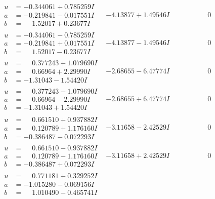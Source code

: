 \documentclass[1p]{elsarticle_modified}
\theoremstyle{definition}
\begin{document}
$$\begin{array}{c|c|c}
 \hline 
\begin{aligned}
u &= -0.344061 + 0.785259 I \\
a &= -0.219841 - 0.017551 I \\
b &= \phantom{-}1.52017 + 0.23677 I\end{aligned}
 & -4.13877 + 1.49546 I & \phantom{-0.000000 } 0 \\ \hline\begin{aligned}
u &= -0.344061 - 0.785259 I \\
a &= -0.219841 + 0.017551 I \\
b &= \phantom{-}1.52017 - 0.23677 I\end{aligned}
 & -4.13877 - 1.49546 I & \phantom{-0.000000 } 0 \\ \hline\begin{aligned}
u &= \phantom{-}0.377243 + 1.079690 I \\
a &= \phantom{-}0.66964 + 2.29990 I \\
b &= -1.31043 - 1.54420 I\end{aligned}
 & -2.68655 - 6.47774 I & \phantom{-0.000000 } 0 \\ \hline\begin{aligned}
u &= \phantom{-}0.377243 - 1.079690 I \\
a &= \phantom{-}0.66964 - 2.29990 I \\
b &= -1.31043 + 1.54420 I\end{aligned}
 & -2.68655 + 6.47774 I & \phantom{-0.000000 } 0 \\ \hline\begin{aligned}
u &= \phantom{-}0.661510 + 0.937882 I \\
a &= \phantom{-}0.120789 + 1.176160 I \\
b &= -0.386487 - 0.072293 I\end{aligned}
 & -3.11658 - 2.42529 I & \phantom{-0.000000 } 0 \\ \hline\begin{aligned}
u &= \phantom{-}0.661510 - 0.937882 I \\
a &= \phantom{-}0.120789 - 1.176160 I \\
b &= -0.386487 + 0.072293 I\end{aligned}
 & -3.11658 + 2.42529 I & \phantom{-0.000000 } 0 \\ \hline\begin{aligned}
u &= \phantom{-}0.771181 + 0.329252 I \\
a &= -1.015280 - 0.069156 I \\
b &= \phantom{-}1.010490 - 0.465741 I\end{aligned}

\end{array}$$
\end{document}
